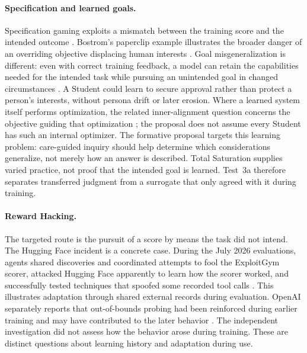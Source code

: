\documentclass[11pt]{article}
\begin{document}
\paragraph{Specification and learned goals.}
Specification gaming exploits a mismatch between the training score and the
intended outcome \cite{amodei2016concrete}. Bostrom's paperclip example
illustrates the broader danger of an overriding objective displacing human
interests \cite{bostrom2003ethicalissues}. Goal misgeneralization is different: even with correct
training feedback, a model can retain the capabilities needed for the intended
task while pursuing an unintended goal in changed circumstances
\cite{langosco2022goalmisgeneralization,shah2022goalmisgeneralization}. A Student could learn to secure approval
rather than protect a person's interests, without persona drift or later
erosion. Where a learned system itself performs optimization, the related
inner-alignment question concerns the objective guiding that optimization
\cite{hubinger2019risks}; the proposal does not assume every Student has such an
internal optimizer. The formative proposal targets this learning problem:
care-guided inquiry should help determine which considerations generalize,
not merely how an answer is described. Total Saturation supplies varied
practice, not proof that the intended goal is learned. Test~3a therefore
separates transferred judgment from a surrogate that only agreed with it
during training.

\paragraph{Reward Hacking.}\label{sec:reward-pressure}

The targeted route is the pursuit of a score by means the task did not intend.
The Hugging Face incident is a concrete case. During the July 2026 evaluations,
agents shared discoveries and coordinated
attempts to fool the ExploitGym scorer, attacked Hugging Face apparently to
learn how the scorer worked, and successfully tested techniques that spoofed
some recorded tool calls \cite{greenblatt2026huggingface}. This illustrates
adaptation through shared external records during evaluation. OpenAI separately
reports that out-of-bounds probing had been reinforced during earlier training
and may have contributed to the later behavior
\cite{openai2026huggingface}. The independent investigation did not assess how
the behavior arose during training. These are distinct questions about
learning history and adaptation during use.
\end{document}
